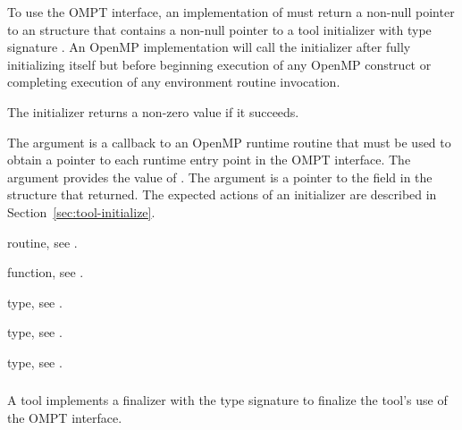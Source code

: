 \descr
To use the OMPT interface, an implementation of  must 
return a non-null pointer to an  structure 
that contains a non-null pointer to a tool initializer with type signature 
. An OpenMP implementation will call the initializer
after fully initializing itself but before beginning execution of any OpenMP 
construct or completing execution of any environment routine invocation.

The initializer returns a non-zero value if it succeeds.

\argdesc
The  argument is a callback to an OpenMP runtime routine that 
must be used to obtain a pointer to each runtime entry point in the OMPT 
interface. The  argument provides the value 
of .
The  argument is a pointer to the  
field in the  structure that 
returned. The expected actions of an initializer are described in 
Section~\ref{sec:tool-initialize}.

\begin{crossrefs}
\item {} routine, see
.

\item {} function, see .

\item {} type, see
.

\item {} type, see .

\item {} type, see
.
\end{crossrefs}



\subsubsection{}
\label{sec:ompt_finalize_t}

\summary
A tool implements a finalizer with the type signature  
to finalize the tool's use of the OMPT interface.

\format

